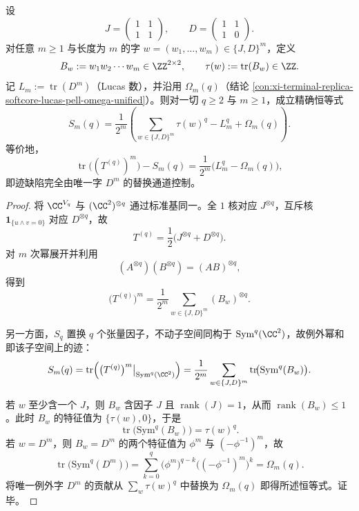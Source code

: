 \begin{theorem}\label{thm:xi-replica-softcore-exceptional-word-trace-master}
设
\[
J=\begin{pmatrix}1&1\\1&1\end{pmatrix},\qquad
D=\begin{pmatrix}1&1\\1&0\end{pmatrix}.
\]
对任意 \(m\ge 1\) 与长度为 \(m\) 的字 \(w=(w_1,\dots,w_m)\in\{J,D\}^m\)，定义
\[
B_w:=w_1w_2\cdots w_m\in\ZZ^{2\times 2},
\qquad
\tau(w):=\operatorname{tr}(B_w)\in\ZZ.
\]
记 \(L_m:=\operatorname{tr}(D^m)\)（Lucas 数），并沿用 \(\Omega_m(q)\)（结论 \ref{con:xi-terminal-replica-softcore-lucas-pell-omega-unified}）。则对一切 \(q\ge 2\) 与 \(m\ge 1\)，成立精确恒等式
\[
S_m(q)
=\frac1{2^m}\left(\sum_{w\in\{J,D\}^m}\tau(w)^q-L_m^q+\Omega_m(q)\right).
\]
等价地，
\[
\operatorname{tr}\!\bigl((T^{(q)})^m\bigr)-S_m(q)
=\frac1{2^m}\bigl(L_m^q-\Omega_m(q)\bigr),
\]
即迹缺陷完全由唯一字 \(D^m\) 的替换通道控制。
\end{theorem}
\begin{proof}
将 \(\CC^{V_q}\) 与 \((\CC^2)^{\otimes q}\) 通过标准基同一。全 \(1\) 核对应 \(J^{\otimes q}\)，互斥核 \(\mathbf{1}_{\{u\wedge v=0\}}\) 对应 \(D^{\otimes q}\)，故
\[
T^{(q)}=\frac12\bigl(J^{\otimes q}+D^{\otimes q}\bigr).
\]
对 \(m\) 次幂展开并利用
\[
(A^{\otimes q})(B^{\otimes q})=(AB)^{\otimes q},
\]
得到
\[
\bigl(T^{(q)}\bigr)^m
=\frac1{2^m}\sum_{w\in\{J,D\}^m}(B_w)^{\otimes q}.
\]

另一方面，\(S_q\) 置换 \(q\) 个张量因子，不动子空间同构于 \(\mathrm{Sym}^q(\CC^2)\)，故例外幂和即该子空间上的迹：
\[
S_m(q)
=\operatorname{tr}\!\left(\bigl(T^{(q)}\bigr)^m\big|_{\mathrm{Sym}^q(\CC^2)}\right)
=\frac1{2^m}\sum_{w\in\{J,D\}^m}\operatorname{tr}\!\bigl(\mathrm{Sym}^q(B_w)\bigr).
\]

若 \(w\) 至少含一个 \(J\)，则 \(B_w\) 含因子 \(J\) 且 \(\operatorname{rank}(J)=1\)，从而 \(\operatorname{rank}(B_w)\le 1\)。此时 \(B_w\) 的特征值为 \(\{\tau(w),0\}\)，于是
\[
\operatorname{tr}\!\bigl(\mathrm{Sym}^q(B_w)\bigr)=\tau(w)^q.
\]
若 \(w=D^m\)，则 \(B_w=D^m\) 的两个特征值为 \(\phi^m\) 与 \((-\phi^{-1})^m\)，故
\[
\operatorname{tr}\!\bigl(\mathrm{Sym}^q(D^m)\bigr)
=\sum_{k=0}^{q}\bigl(\phi^m\bigr)^{q-k}\bigl((-\phi^{-1})^m\bigr)^k
=\Omega_m(q).
\]
将唯一例外字 \(D^m\) 的贡献从 \(\sum_w\tau(w)^q\) 中替换为 \(\Omega_m(q)\) 即得所述恒等式。证毕。
\end{proof}

